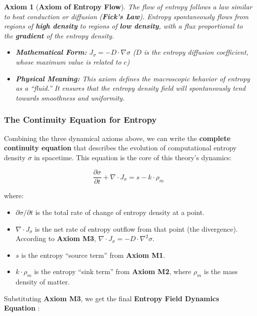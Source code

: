 \documentclass[11pt, a4paper]{article}
\newtheorem{axiom}{Axiom}[section]
\begin{document}
\begin{axiom}[\textbf{Axiom of Entropy Flow}]
The flow of entropy follows a law similar to heat conduction or diffusion (\textbf{Fick's Law}). Entropy spontaneously flows from regions of \textbf{high density} to regions of \textbf{low density}, with a flux proportional to the \textbf{gradient} of the entropy density.
\begin{itemize}
    \item \textbf{Mathematical Form:} $J_\sigma = -D \cdot \nabla\sigma$ ($D$ is the entropy diffusion coefficient, whose maximum value is related to $c$)
    \item \textbf{Physical Meaning:} This axiom defines the macroscopic behavior of entropy as a ``fluid.'' It ensures that the entropy density field will spontaneously tend towards smoothness and uniformity.
\end{itemize}
\end{axiom}

\subsubsection{The Continuity Equation for Entropy}

Combining the three dynamical axioms above, we can write the \textbf{complete continuity equation} that describes the evolution of computational entropy density $\sigma$ in spacetime. This equation is the core of this theory's dynamics:

\[
\frac{\partial\sigma}{\partial t} + \nabla \cdot J_\sigma = s - k \cdot \rho_m
\]

where:
\begin{itemize}
    \item $\partial\sigma/\partial t$ is the total rate of change of entropy density at a point.
    \item $\nabla \cdot J_\sigma$ is the net rate of entropy outflow from that point (the divergence). According to \textbf{Axiom M3}, $\nabla \cdot J_\sigma = -D \cdot \nabla^2\sigma$.
    \item $s$ is the entropy ``source term'' from \textbf{Axiom M1}.
    \item $k \cdot \rho_m$ is the entropy ``sink term'' from \textbf{Axiom M2}, where $\rho_m$ is the mass density of matter.
\end{itemize}

Substituting \textbf{Axiom M3}, we get the final \textbf{Entropy Field Dynamics Equation} \cite{Newton1687}:
\end{document}
